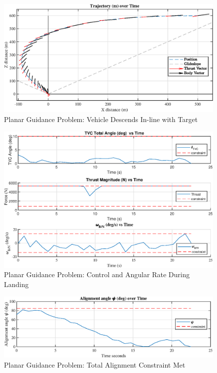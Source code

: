 \documentclass[conf]{new-aiaa}
\begin{document}
\begin{figure}[!htbp] 
  \centering
  \includegraphics[width=\textwidth]{figs/planar_traj.eps}
  \caption{Planar Guidance Problem: Vehicle Descends In-line with Target}
  \label{fig:planar}
 \end{figure}
\begin{figure}[!htbp] 
\label{planar_controls}
  \centering
  \includegraphics[width=\textwidth]{figs/planar_controls.eps}
  \caption{Planar Guidance Problem: Control and Angular Rate During Landing}
  \label{fig:planarcontrols}
 \end{figure}

\begin{figure}[!htbp] 
  \centering
  \includegraphics[width=\textwidth]{figs/planar_alignment.eps}
  \caption{Planar Guidance Problem: Total Alignment Constraint Met}
  \label{fig:nplanar_align}
 \end{figure}
\end{document}
